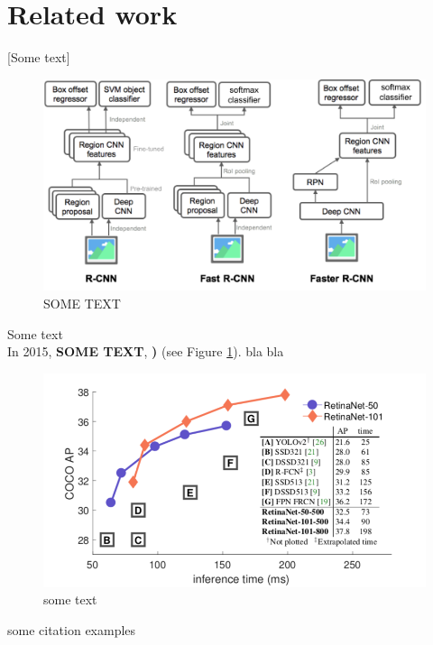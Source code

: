 \documentclass[a4paper]{article}
\begin{document}
\newpage

\section{Related work}
[Some text]

\begin{figure}
\includegraphics[scale=0.18]{images/FRCN_architecture}
\caption{SOME TEXT}
\label{fig:rcnn-architectures}
\end{figure} Some text \\ In 2015, \textbf{SOME TEXT}, \cite{DBLP:journals/corr/RenHG015}\textbf{)} (see Figure \ref{fig:rcnn-architectures}). 
\newline \newline \newline \newline \newline \newline \newline \newline\newline \newline\newline \newline\newline \newline\newline 
bla bla \\
\begin{figure}

\includegraphics[scale=0.32]{images/retinanet}
\caption{some text}
\end{figure}
some citation examples 
 \cite{DBLP:journals/corr/abs-1708-02002}\cite{DBLP:journals/corr/LinDGHHB16} 
\end{document}

